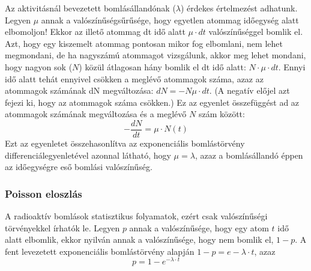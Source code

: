 \documentclass[../main.tex]{subfiles}
\begin{document}
Az aktivitásnál bevezetett bomlásállandónak ($\lambda$) érdekes értelmezést adhatunk. Legyen $\mu$ annak a valószínűségsűrűsége, hogy egyetlen atommag időegység alatt elbomoljon!
Ekkor az illető atommag dt idő alatt $\mu\cdot dt$ valószínűséggel bomlik el. Azt, hogy egy kiszemelt atommag pontosan mikor fog elbomlani, nem lehet megmondani, de ha nagyszámú
atommagot vizsgálunk, akkor meg lehet mondani, hogy nagyon sok ($N$) közül átlagosan
hány bomlik el dt idő alatt: $N \cdot \mu \cdot dt$. Ennyi idő alatt tehát ennyivel csökken a meglévő
atommagok száma, azaz az atommagok számának dN megváltozása: $dN =-N  \mu \cdot dt$.
(A negatív előjel azt fejezi ki, hogy az atommagok száma csökken.) Ez az egyenlet
összefüggést ad az atommagok számának megváltozása és a meglévő $N$ szám között:
\begin{equation}
    -\frac{dN}{dt} = \mu \cdot N(t)
\end{equation}
Ezt az egyenletet összehasonlítva az exponenciális bomlástörvény differenciálegyenletével azonnal látható, hogy $\mu = \lambda$, azaz a bomlásállandó éppen az időegységre eső bomlási valószínűség.

\subsubsection*{Poisson eloszlás}
A radioaktív bomlások statisztikus folyamatok, ezért csak valószínűségi törvényekkel
írhatók le. Legyen $p$ annak a valószínűsége, hogy egy atom $t$ idő alatt elbomlik, ekkor
nyilván annak a valószínűsége, hogy nem bomlik el, $1-p$. A fent levezetett exponenciális
bomlástörvény alapján $1 - p = e - \lambda \cdot t$, azaz
\begin{equation}
    p = 1 - e^{-\lambda \cdot t}
\end{equation}
\end{document}
